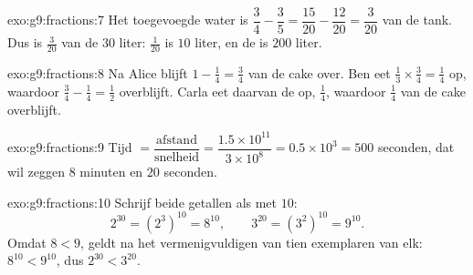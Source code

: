 \begin{solution}{exo:g9:fractions:7}
Het toegevoegde water is
$\dfrac34 - \dfrac35 = \dfrac{15}{20} - \dfrac{12}{20} = \dfrac{3}{20}$
van de tank. Dus is $\frac{3}{20}$ van de  $30$ liter: $\frac{1}{20}$ is
$10$ liter, en de  is $200$ liter.
\end{solution}

\begin{solution}{exo:g9:fractions:8}
Na Alice blijft $1 - \frac14 = \frac34$ van de cake over. Ben eet
$\frac13 \times \frac34 = \frac14$ op, waardoor $\frac34 - \frac14 = \frac12$
overblijft. Carla eet daarvan de  op, $\frac14$, waardoor $\frac14$ van de
cake overblijft.
\end{solution}

\begin{solution}{exo:g9:fractions:9}
Tijd $= \dfrac{\text{afstand}}{\text{snelheid}} =
\dfrac{1.5 \times 10^{11}}{3 \times 10^8} = 0.5 \times 10^3 = 500$ seconden, dat
wil zeggen $8$ minuten en $20$ seconden.
\end{solution}

\begin{solution}{exo:g9:fractions:10}
Schrijf beide getallen als  met  $10$:
\[
2^{30} = \left(2^3\right)^{10} = 8^{10},
\qquad
3^{20} = \left(3^2\right)^{10} = 9^{10}.
\]
Omdat $8 < 9$, geldt na het vermenigvuldigen van tien exemplaren van elk:
$8^{10} < 9^{10}$, dus $2^{30} < 3^{20}$.
\end{solution}

